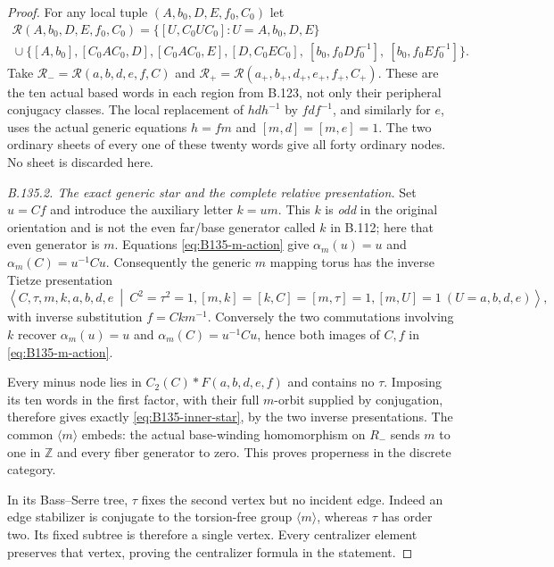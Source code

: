 \begin{proof}
For any local tuple $(A,b_0,D,E,f_0,C_0)$ let
\begin{equation}\label{eq:B135-ten-words}
 \begin{gathered}
 \mathcal R(A,b_0,D,E,f_0,C_0)=
 \bigl\{[U,C_0UC_0]:U=A,b_0,D,E\bigr\}\\
 {}\cup\bigl\{[A,b_0],[C_0AC_0,D],[C_0AC_0,E],
 [D,C_0EC_0],\ [b_0,f_0Df_0^{-1}],\ [b_0,f_0Ef_0^{-1}]\bigr\}.
 \end{gathered}
\end{equation}
Take $\mathcal R_- =\mathcal R(a,b,d,e,f,C)$ and
$\mathcal R_+=\mathcal R(a_+,b_+,d_+,e_+,f_+,C_+)$.
These are the ten actual based words in each region from B.123,
not only their peripheral conjugacy classes. The local replacement
of $hdh^{-1}$ by $fdf^{-1}$, and similarly for $e$, uses the
actual generic equations $h=fm$ and $[m,d]=[m,e]=1$.
The two ordinary sheets of every one of these twenty words
give all forty ordinary nodes. No sheet is discarded here.

\emph{B.135.2. The exact generic star and the complete relative presentation.}
Set $u=Cf$ and introduce the auxiliary letter $k=um$.
This $k$ is \emph{odd} in the original orientation and is not
the even far/base generator called $k$ in B.112; here that
even generator is $m$.
Equations \eqref{eq:B135-m-action} give $\alpha_m(u)=u$ and
$\alpha_m(C)=u^{-1}Cu$. Consequently the generic $m$ mapping
torus has the inverse Tietze presentation
\begin{equation}\label{eq:B135-graph-star}
 \left\langle C,\tau,m,k,a,b,d,e\ \middle|\
 C^2=\tau^2=1, [m,k]=[k,C]=[m,\tau]=1,
 [m,U]=1\ (U=a,b,d,e)\right\rangle,
\end{equation}
with inverse substitution $f=Ckm^{-1}$.
Conversely the two commutations involving $k$ recover
$\alpha_m(u)=u$ and $\alpha_m(C)=u^{-1}Cu$, hence both
images of $C,f$ in \eqref{eq:B135-m-action}.

Every minus node lies in $C_2(C)*F(a,b,d,e,f)$ and contains
no $\tau$. Imposing its ten words in the first factor, with
their full $m$-orbit supplied by conjugation, therefore gives
exactly \eqref{eq:B135-inner-star}, by the two inverse
presentations. The common $\langle m\rangle$ embeds: the
actual base-winding homomorphism on $R_-$ sends $m$ to one
in $\mathbb Z$ and every fiber generator to zero.
This proves properness in the discrete category.

In its Bass--Serre tree, $\tau$ fixes the second vertex but
no incident edge. Indeed an edge stabilizer is conjugate to
the torsion-free group $\langle m\rangle$, whereas $\tau$
has order two. Its fixed subtree is therefore a single vertex.
Every centralizer element preserves that vertex, proving the
centralizer formula in the statement.


\end{proof}

